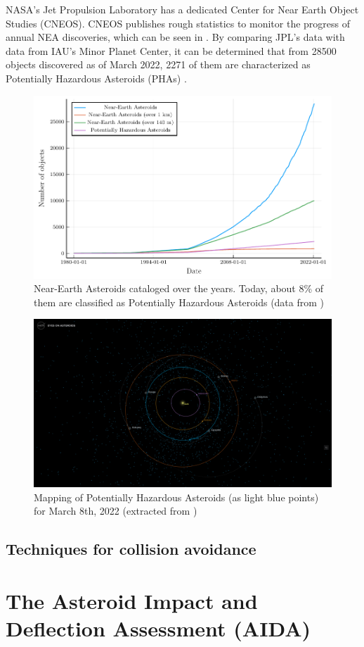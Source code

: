 NASA's Jet Propulsion Laboratory has a dedicated Center for Near Earth Object Studies (CNEOS). CNEOS publishes rough statistics to monitor the progress of annual NEA discoveries, which can be seen in . By comparing JPL's data with data from IAU's Minor Planet Center, it can be determined that from \num{28500} objects discovered as of March 2022, \num{2271} of them are characterized as Potentially Hazardous Asteroids (PHAs) \cite{mpc_data}. 

\begin{figure}[h]
	\centering
	\includegraphics[width=\textwidth]{Figures/Chapter1/jpl_nea_data.pdf}
	\caption{Near-Earth Asteroids cataloged over the years. Today, about 8\% of them are classified as Potentially Hazardous Asteroids (data from \cite{nea_stats_jpl})}
	\label{fig:NEA_nasa}
\end{figure}


\begin{figure}[h]
	\centering
	\includegraphics[width=\textwidth]{Figures/Chapter1/eyes_on_asteroids.png}
	\caption{Mapping of Potentially Hazardous Asteroids (as light blue points) for March 8th, 2022 (extracted from \cite{eyes_on_asteroids})}
	\label{fig:eyes_on_asteroids}
\end{figure}

\subsection{Techniques for collision avoidance}
\label{ssec:collision_avoidance}


\section{The Asteroid Impact and Deflection Assessment (AIDA)}